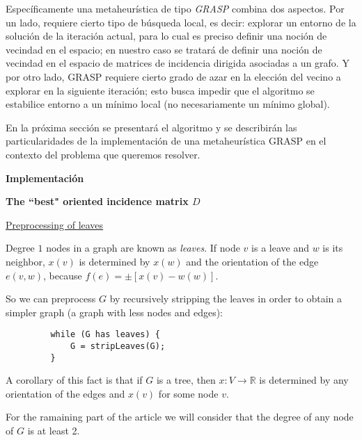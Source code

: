 \documentclass[a4paper,11pt]{article}
\begin{document}
Específicamente una metaheurística de tipo \textit{GRASP} combina dos 
aspectos. Por un lado, requiere cierto tipo de búsqueda local, es decir: 
explorar un entorno de la solución de la iteración actual, para lo cual 
es preciso definir una noción de vecindad en el espacio; en nuestro caso 
se tratará de definir una noción de vecindad en el espacio de matrices 
de incidencia dirigida asociadas a un grafo. Y por otro lado, GRASP 
requiere cierto grado de azar en la elección del vecino a explorar en 
la siguiente iteración; esto busca impedir que el algoritmo se 
estabilice entorno a un mínimo local (no necesariamente un mínimo 
global). 

\bigskip

En la próxima sección se presentará el algoritmo y se describirán las 
particularidades de la implementación de una metaheurística GRASP en el 
contexto del problema que queremos resolver.

\bigskip

\textbf{Implementación}

\bigskip

\textbf{The ``best" oriented incidence matrix $D$}

\bigskip

\underline{Preprocessing of leaves}

\bigskip

Degree $1$ nodes in a graph are known as \textit{leaves}. If node $v$ 
is a leave and $w$ is its neighbor, $x(v)$ is determined by $x(w)$ and 
the orientation of the edge $e(v,w)$, because $f(e) = \pm[x(v) - w(w)]$.

\bigskip

So we can preprocess $G$ by recursively stripping the leaves in order 
to obtain a simpler graph (a graph with less nodes and edges):

\bigskip

\begin{verbatim}
         while (G has leaves) {
             G = stripLeaves(G);
         }
\end{verbatim}

A corollary of this fact is that if $G$ is a tree, then $x: V 
\rightarrow \mathbb{R}$ is determined by any orientation of the edges 
and $x(v)$ for some node $v$.

\bigskip

For the ramaining part of the article we will consider that the degree 
of any node of $G$ is at least 2.

\bigskip
\end{document}
